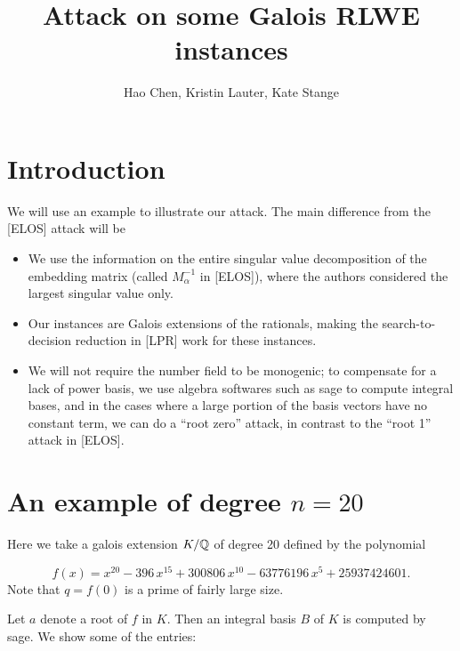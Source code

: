 \documentclass{amsart}
\title{Attack on some Galois RLWE instances}
\author{Hao Chen, Kristin Lauter, Kate Stange}
\begin{document}
\maketitle

\section{Introduction}

We will use an example to illustrate our attack. The main
difference from the [ELOS] attack will be
\begin{itemize}
\item We use the information on the entire singular value
decomposition of the embedding matrix (called $M_\alpha^{-1}$ in [ELOS]), where the authors considered the largest singular value only.

\item Our instances are Galois extensions of the rationals, making the search-to-decision reduction in [LPR] work for these instances.

\item We will not require the number field to be monogenic;
to compensate for a lack of power basis, we use algebra softwares such as sage to compute integral bases, and in the cases where a large portion of the basis vectors have no constant term, we can do a ``root zero'' attack, in contrast to the ``root 1'' attack in [ELOS].
\end{itemize}

\section{An example of degree $n = 20$}

Here we take a galois extension $K/\mathbb{Q}$ of degree 20 defined by the polynomial

$$f(x) = x^{20} - 396 \, x^{15} + 300806 \, x^{10} - 63776196 \, x^{5} + 25937424601.$$
Note that $q = f(0)$ is a prime of fairly large size.

Let $a$ denote a root of $f$ in $K$. Then an integral basis $B$ of $K$ is computed by sage. We show some of the entries:
\end{document}
